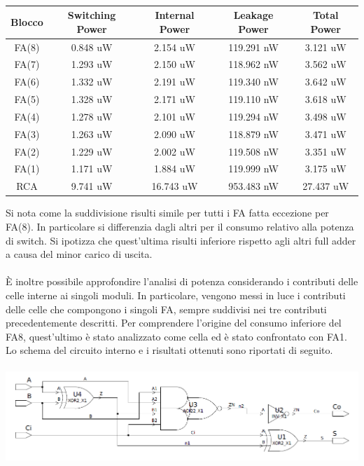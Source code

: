 \documentclass[11pt,  english, makeidx, a4paper, titlepage, oneside]{book}
\begin{document}
\\
\begin{center}
	\begin{tabular}{|c|c|c|c|c|}
	\hline
	Blocco &  Switching Power & Internal Power & Leakage Power & Total Power \\ 
	\hline
	FA(8) & 0.848 uW & 2.154 uW & 119.291 nW & 3.121 uW  \\
	\hline
	FA(7) & 1.293 uW & 2.150 uW & 118.962 nW & 3.562 uW  \\
	\hline
	FA(6) & 1.332 uW & 2.191 uW & 119.340 nW & 3.642 uW  \\
	\hline
	FA(5) & 1.328 uW & 2.171 uW & 119.110 nW & 3.618 uW  \\
	\hline
	FA(4) & 1.278 uW & 2.101 uW & 119.294 nW & 3.498 uW  \\
	\hline
	FA(3) & 1.263 uW & 2.090 uW & 118.879 nW & 3.471 uW  \\
	\hline
	FA(2) & 1.229 uW & 2.002 uW & 119.508 nW & 3.351 uW  \\
	\hline
	FA(1) & 1.171 uW & 1.884 uW & 119.999 nW & 3.175 uW  \\
	\hline
	RCA & 9.741 uW & 16.743 uW & 953.483 nW & 27.437 uW  \\
	\hline
	\end{tabular}
\end{center}
\vspace{0.3cm}
Si nota come la suddivisione risulti simile per tutti i FA fatta eccezione per FA(8). In particolare si differenzia dagli altri per il consumo relativo alla potenza di switch. Si ipotizza che quest'ultima risulti inferiore rispetto agli altri full adder a causa del minor carico di uscita.
\\\\
È inoltre possibile approfondire l'analisi di potenza considerando i contributi delle celle interne ai singoli moduli. In particolare, vengono messi in luce i contributi delle celle che compongono i singoli FA, sempre suddivisi nei tre contributi precedentemente descritti.
Per comprendere l'origine del consumo inferiore del FA8, quest'ultimo è stato analizzato come cella ed è stato confrontato con FA1.
Lo schema del circuito interno e i risultati ottenuti sono riportati di seguito.
\\\\
\includegraphics[width=15cm]{./img/Lab_1/Es_3/Full_adder.png}
\end{document}
